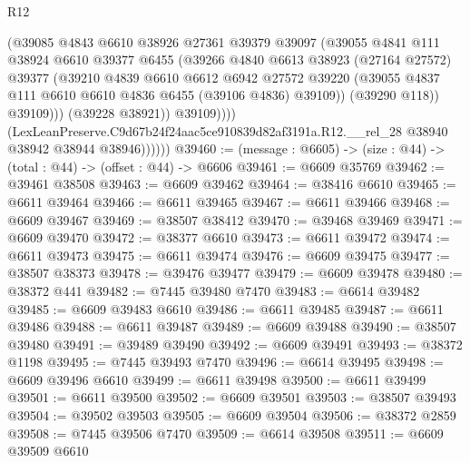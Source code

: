 \begin{lexlean}{R12}
\begin{coremodule}
                          (@39085
                            @4843
                            @6610
                            @38926
                            @27361
                            @39379
                            @39097
                            (@39055
                              @4841
                              @111
                              @38924
                              @6610
                              @39377
                              @6455
                              (@39266
                                @4840
                                @6613
                                @38923
                                (@27164 @27572)
                                @39377
                                (@39210
                                  @4839
                                  @6610
                                  @6612
                                  @6942
                                  @27572
                                  @39220
                                  (@39055 @4837 @111 @6610 @6610 @4836 @6455 (@39106 @4836) @39109))
                                (@39290 @118))
                              @39109)))
                        (@39228 @38921))
                      @39109))))
              (LexLeanPreserve.C9d67b24f24aac5ce910839d82af3191a.R12.__rel_28
                @38940
                @38942
                @38944
                @38946))))))
@39460 := (message : @6605) -> (size : @44) -> (total : @44) -> (offset : @44) -> @6606
@39461 := @6609 @35769
@39462 := @39461 @38508
@39463 := @6609 @39462
@39464 := @38416 @6610
@39465 := @6611 @39464
@39466 := @6611 @39465
@39467 := @6611 @39466
@39468 := @6609 @39467
@39469 := @38507 @38412
@39470 := @39468 @39469
@39471 := @6609 @39470
@39472 := @38377 @6610
@39473 := @6611 @39472
@39474 := @6611 @39473
@39475 := @6611 @39474
@39476 := @6609 @39475
@39477 := @38507 @38373
@39478 := @39476 @39477
@39479 := @6609 @39478
@39480 := @38372 @441
@39482 := @7445 @39480 @7470
@39483 := @6614 @39482
@39485 := @6609 @39483 @6610
@39486 := @6611 @39485
@39487 := @6611 @39486
@39488 := @6611 @39487
@39489 := @6609 @39488
@39490 := @38507 @39480
@39491 := @39489 @39490
@39492 := @6609 @39491
@39493 := @38372 @1198
@39495 := @7445 @39493 @7470
@39496 := @6614 @39495
@39498 := @6609 @39496 @6610
@39499 := @6611 @39498
@39500 := @6611 @39499
@39501 := @6611 @39500
@39502 := @6609 @39501
@39503 := @38507 @39493
@39504 := @39502 @39503
@39505 := @6609 @39504
@39506 := @38372 @2859
@39508 := @7445 @39506 @7470
@39509 := @6614 @39508
@39511 := @6609 @39509 @6610

\end{coremodule}
\end{lexlean}
